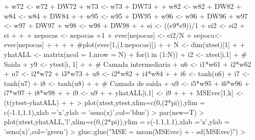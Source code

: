 \documentclass{article}
\begin{document}
\begin{Schunk}
\begin{Sinput}
{{{+       w72 <- w72 + DW72
+       w73 <- w73 + DW73
+       
+       w82 <- w82 + DW82
+       w84 <- w84 + DW84
+       
+       w95 <- w95 + DW95
+       w96 <- w96 + DW96
+       w97 <- w97 + DW97
+       w98 <- w98 + DW98
+       
+       ei <- ((e9*e9))/1
+       ei2 <- ei2 + ei
+     }
+     
+     nepocas <- nepocas +1
+     evec[nepocas] <- ei2/N
+     eepoca<-evec[nepocas]
+     
+   }
+   
+   #plot(evec[1,(1:nepocas)])
+   
+   N <- dim(xtest)[1]
+   
+   yhatALL <- matrix(ncol = 1,nrow = N)
+   for(i in (1:N)){
+     i2 <- xtest[i,1]
+     # Saida  
+     y9 <- ytest[i, 1]
+     
+     # Camada intermediaria
+     u6 <- i1*w61 + i2*w62
+     u7 <- i2*w72 + i3*w73
+     u8 <- i2*w82 + i4*w84
+     
+     i6 <- tanh(u6)
+     i7 <- tanh(u7)
+     i8 <- tanh(u8)
+     
+     # Camada de saida
+     u9 <- i5*w95 + i6*w96 + i7*w97 + i8*w98
+     
+     i9 <- u9
+     
+     yhatALL[i,1] <- i9
+   }
+ 
+   MSEvec[1,k] <- (t(ytest-yhatALL) %
+   
+ }
> plot(xtest,ytest,xlim=c(0,(2*pi)),ylim = c(-1.1,1.1),xlab ='x',ylab = 'seno(x)',col='blue')
> par(new=T)
> plot(xtest,yhatALL,'l',xlim=c(0,(2*pi)),ylim = c(-1.1,1.1),xlab ='x',ylab = 'seno(x)',col='green')
> glue::glue("MSE = {mean(MSEvec)} + - {sd(MSEvec)}\n")
> 
\end{Sinput}
\end{Schunk}
\end{document}
